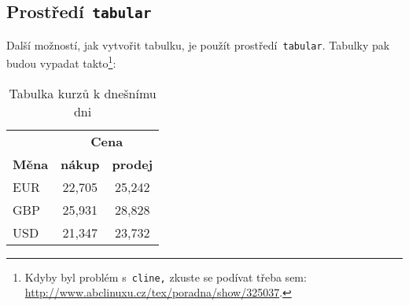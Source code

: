 \documentclass[hidelinks, 11pt, a4paper]{article}
\begin{document}
\subsection{Prostředí\texttt{ tabular}}
Další možností, jak vytvořit tabulku, je použít prostředí\texttt{ tabular}. Tabulky pak budou vypadat takto\footnote[1]{Kdyby byl problém s\texttt{ cline,} zkuste se podívat třeba sem: \href{http://www.abclinuxu.cz/tex/poradna/show/325037}{http://www.abclinuxu.cz/tex/poradna/show/325037}.}:
\bigskip
\begin{table}[h]
    \centering
    \begin{tabular}{|l|c|c|} \hline
        
        & \multicolumn{2}{c|}{\textbf{Cena}} \\
        \cline{2-3}
        \textbf{Měna} & \textbf{nákup}	& \textbf{prodej} \\ \hline
        EUR	 &	22,705  & 25,242 \\
        GBP	&	25,931 &	28,828 \\ 
        USD	&	21,347 &	23,732 \\ \hline
    \end{tabular}
    \caption{Tabulka kurzů k dnešnímu dni}
    \label{tab:tabulka1}
\end{table}
\bigskip
\end{document}
